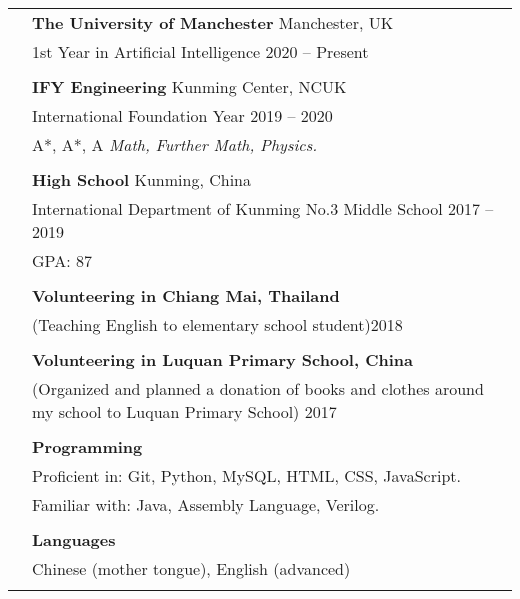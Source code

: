 \documentclass[letterpaper, 11pt]{article}
\begin{document}
\begin{longtable}{p{1.3in}p{4.8in}}



\color{OliveGreen}{\textbf{\textit{Education}}} 
& \textbf{The University of Manchester} \hfill Manchester, UK \\ 
& 1st Year in Artificial Intelligence \hfill 2020 -- Present \\
& \\

& \textbf{IFY Engineering} \hfill Kunming Center, NCUK \\
& International Foundation Year \hfill 2019  -- 2020\\
& A*, A*, A {\it Math, Further Math, Physics.}\\
& \\

& \textbf{High School} \hfill Kunming, China\\
& International Department of Kunming No.3 Middle School \hfill 2017 -- 2019 \\
& GPA: 87\\
& \\



{\color{OliveGreen}{\textbf{\textit{Experience}}}} 
& \textbf{Volunteering in Chiang Mai, Thailand} \\
&(Teaching English to elementary school student)\hfill 2018 \\
&\\
&\textbf{Volunteering  in Luquan Primary School, China} \\
&(Organized and planned a donation of books and clothes around my school to Luquan Primary School) \hfill 2017 \\
& \\


{\color{OliveGreen}{\textbf{\textit{Skills}}}} 
& \textbf{Programming}\\
& Proficient in: Git, Python, MySQL, HTML, CSS, JavaScript. \\
& Familiar with:  Java, Assembly Language, Verilog. \\
& \\

& \textbf{Languages} \\
& Chinese (mother tongue), English (advanced) \\
& \\


\end{longtable}
\end{document}
